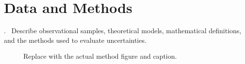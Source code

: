 \section{Data and Methods}
\label{sec:methods}
\begin{block}{\thesection.\ \insertsectionhead}
Describe observational samples, theoretical models, mathematical definitions,
and the methods used to evaluate uncertainties.
\begin{figure}
  \centering
  \setlength{\fboxsep}{0pt}%
  \caption{Replace with the actual method figure and caption.}
  \label{fig:methods}
\end{figure}
\end{block}
